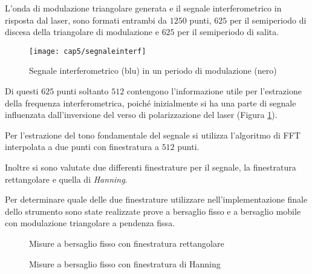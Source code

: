 L'onda di modulazione triangolare generata e il segnale interferometrico in risposta dal laser, sono formati entrambi da $1250$ punti, $625$ per il semiperiodo di discesa della triangolare di modulazione e $625$ per il semiperiodo di salita. 
\begin{figure}  
  \begin{center}
    \texttt{[image: cap5/segnaleinterf]}
    \caption{Segnale interferometrico (blu) in un periodo di modulazione (nero)}
    \label{segnaleinterf}
  \end{center}
\end{figure}

Di questi $625$ punti soltanto $512$ contengono l'informazione utile per l'estrazione della frequenza interferometrica, poiché inizialmente si ha una parte di segnale influenzata dall'inversione del verso di polarizzazione del laser (Figura \ref{segnaleinterf}). 

Per l'estrazione del tono fondamentale del segnale si utilizza l'algoritmo di FFT interpolata a due punti con finestratura a $512$ punti.

Inoltre si sono valutate due differenti finestrature per il segnale, la finestratura rettangolare e quella di \textit{Hanning}.

Per determinare quale delle due finestrature utilizzare nell'implementazione finale dello strumento sono state realizzate prove a bersaglio fisso e a bersaglio mobile con modulazione triangolare a pendenza fissa.
\begin{figure}
\centering
{}
\hspace{5mm}
\caption{Misure a bersaglio fisso con finestratura rettangolare}\label{misfisso1}
\end{figure}

\begin{figure}
\centering
{}
\hspace{5mm}
\caption{Misure a bersaglio fisso con finestratura di Hanning}\label{misfisso2}
\end{figure}

